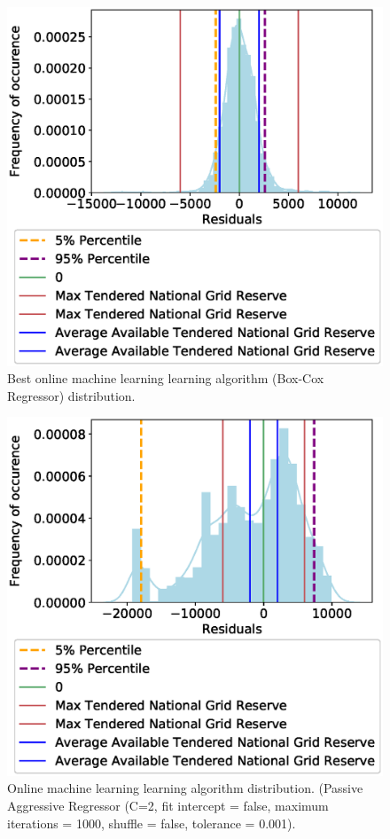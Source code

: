 \documentclass[final,3p,times,twocolumn,numbers]{elsarticle}
\begin{document}
\begin{figure}
\centering
\includegraphics[width=\columnwidth,natwidth=500,natheight=500]{figures/results/online_learning_dists-power-0.1.eps}
\caption{Best online machine learning learning algorithm (Box-Cox Regressor) distribution.}
\label{fig:best_online_learning_day_distribution}
\end{figure}


\begin{figure}
\centering
\includegraphics[width=\columnwidth,natwidth=500,natheight=500]{figures/results/online_learning_dists-PA-regressor-C-2-fit_intercept-false-max_iter-1000-shuffle-false-tol-0.001.eps}
\caption{Online machine learning learning algorithm distribution. (Passive Aggressive Regressor (C=2, fit intercept = false, maximum iterations = 1000, shuffle = false, tolerance = 0.001).}
\label{fig:bad_online_learning_day_distribution}
\end{figure}
\end{document}
